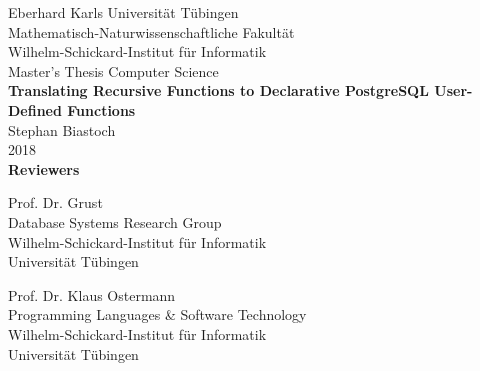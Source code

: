 \documentclass[twoside,10pt,a4paper]{report}
\begin{document}
\newcommand{\highlight}[2][yellow]{\mathchoice%
  {\colorbox{#1}{$\displaystyle#2$}}%
  {\colorbox{#1}{$\textstyle#2$}}%
  {\colorbox{#1}{$\scriptstyle#2$}}%
  {\colorbox{#1}{$\scriptscriptstyle#2$}}}%


 
\begin{titlepage}
 \begin{center}
  {\LARGE Eberhard Karls Universität Tübingen}\\
  {\large Mathematisch-Naturwissenschaftliche Fakultät \\
Wilhelm-Schickard-Institut für Informatik\\[4cm]}
  {\huge Master's Thesis Computer Science\\[2cm]}
  {\Large\bf Translating Recursive Functions to Declarative PostgreSQL User-Defined Functions\\[1.5cm]}
 {\large Stephan Biastoch}\\[0.5cm]
2018\\[4cm]
{\small\bf Reviewers}\\[0.5cm]
  \parbox{7cm}{\begin{center}{\large Prof. Dr. Grust}\\
  {\footnotesize Database Systems Research Group\\ Wilhelm-Schickard-Institut für Informatik\\%
	Universität Tübingen}\end{center}}\hfill\parbox{7cm}{\begin{center}
  {\large Prof. Dr. Klaus Ostermann}\\
  {\footnotesize Programming Languages \& Software Technology \\ Wilhelm-Schickard-Institut für Informatik\\%
	Universität Tübingen}\end{center}
 }
	

  \end{center}
\end{titlepage}
\end{document}
